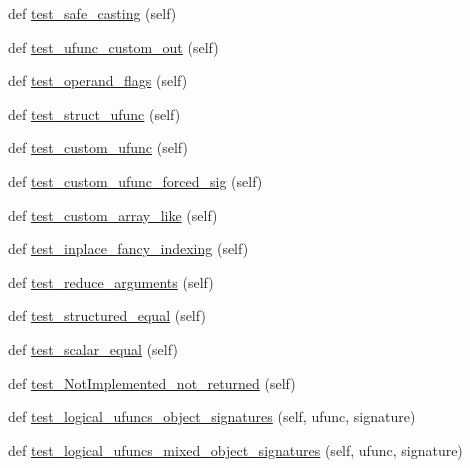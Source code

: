 \begin{DoxyCompactItemize}
def \hyperlink{classnumpy_1_1core_1_1tests_1_1test__ufunc_1_1TestUfunc_a9af16516cfbf06149760911c134d70ed}{test\+\_\+safe\+\_\+casting} (self)
\item 
def \hyperlink{classnumpy_1_1core_1_1tests_1_1test__ufunc_1_1TestUfunc_a73e0aa889b3c215d0f6e129b7d4bde99}{test\+\_\+ufunc\+\_\+custom\+\_\+out} (self)
\item 
def \hyperlink{classnumpy_1_1core_1_1tests_1_1test__ufunc_1_1TestUfunc_a5072a62dc74b505a4c592e12b51b319c}{test\+\_\+operand\+\_\+flags} (self)
\item 
def \hyperlink{classnumpy_1_1core_1_1tests_1_1test__ufunc_1_1TestUfunc_acb9e35136af2f4fec8be704c1d14c700}{test\+\_\+struct\+\_\+ufunc} (self)
\item 
def \hyperlink{classnumpy_1_1core_1_1tests_1_1test__ufunc_1_1TestUfunc_aef1dd9a2399bf08eb7625c17b0885341}{test\+\_\+custom\+\_\+ufunc} (self)
\item 
def \hyperlink{classnumpy_1_1core_1_1tests_1_1test__ufunc_1_1TestUfunc_a191c1136af66556da19609989eab8ce8}{test\+\_\+custom\+\_\+ufunc\+\_\+forced\+\_\+sig} (self)
\item 
def \hyperlink{classnumpy_1_1core_1_1tests_1_1test__ufunc_1_1TestUfunc_aa5c5af55c2ee2f882f5d25fb28213267}{test\+\_\+custom\+\_\+array\+\_\+like} (self)
\item 
def \hyperlink{classnumpy_1_1core_1_1tests_1_1test__ufunc_1_1TestUfunc_a21b8399be66bff06aa31ee6e9a9aa6cf}{test\+\_\+inplace\+\_\+fancy\+\_\+indexing} (self)
\item 
def \hyperlink{classnumpy_1_1core_1_1tests_1_1test__ufunc_1_1TestUfunc_a72ab453d1a287639d5279b6a01c9d791}{test\+\_\+reduce\+\_\+arguments} (self)
\item 
def \hyperlink{classnumpy_1_1core_1_1tests_1_1test__ufunc_1_1TestUfunc_a56353c2accd1f1f27d0d18f8232f9246}{test\+\_\+structured\+\_\+equal} (self)
\item 
def \hyperlink{classnumpy_1_1core_1_1tests_1_1test__ufunc_1_1TestUfunc_a7553fcef8fdbf21bd5d511a9860503cb}{test\+\_\+scalar\+\_\+equal} (self)
\item 
def \hyperlink{classnumpy_1_1core_1_1tests_1_1test__ufunc_1_1TestUfunc_a50a29ab9041a066b85db377d77aaa8e7}{test\+\_\+\+Not\+Implemented\+\_\+not\+\_\+returned} (self)
\item 
def \hyperlink{classnumpy_1_1core_1_1tests_1_1test__ufunc_1_1TestUfunc_af7313102a6124aa7fda993b2a82c1165}{test\+\_\+logical\+\_\+ufuncs\+\_\+object\+\_\+signatures} (self, ufunc, signature)
\item 
def \hyperlink{classnumpy_1_1core_1_1tests_1_1test__ufunc_1_1TestUfunc_a1b02cb15e8337699e6aa8a839407ef44}{test\+\_\+logical\+\_\+ufuncs\+\_\+mixed\+\_\+object\+\_\+signatures} (self, ufunc, signature)

\end{DoxyCompactItemize}
